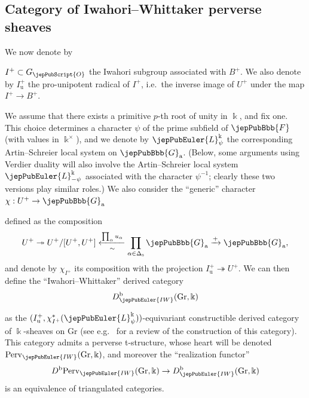 \subsection{Category of Iwahori--Whittaker perverse sheaves}
\label{jep104local034}

We now denote by 

$I^+ \subset G_{\jepPubScript{O}}$ the Iwahori subgroup associated with $B^+$. We also denote by $I^+_\mathrm{u}$ the pro-unipotent radical of $I^+$, i.e.~the inverse image of $U^+$ under the map $I^+ \to B^+$.

We assume that there exists a primitive $p$-th root of unity in $\Bbbk$, and fix one. This choice determines a
character $\psi$ of the prime subfield of $\jepPubBbb{F}$ (with values in $\Bbbk^\times$), and we denote by $\jepPubEuler{L}^\Bbbk_\psi$ the corresponding Artin--Schreier local system on $\jepPubBbb{G}_{\mathrm{a}}$. (Below, some arguments using Verdier duality will also involve the Artin--Schreier local system $\jepPubEuler{L}^\Bbbk_{-\psi}$ associated with the character $\psi^{-1}$; clearly these two versions play similar roles.) We also consider the ``generic'' character $\chi : U^+ \to \jepPubBbb{G}_{\mathrm{a}}$ 

defined as the composition
\[
 U^+ \twoheadrightarrow U^+ / [U^+,U^+] \xleftarrow[\sim]{\prod_{\alpha} u_\alpha} \prod_{\alpha \in \Delta_{\mathrm{s}}} \jepPubBbb{G}_{\mathrm{a}} \xrightarrow{+} \jepPubBbb{G}_{\mathrm{a}},
\]
and denote by $\chi_{I^+}$ its composition with the projection $I^+_\mathrm{u} \twoheadrightarrow U^+$. We can then define the ``Iwahori--Whittaker'' derived category
\[
D^{\mathrm{b}}_{\jepPubEuler{IW}}(\mathrm{Gr}, \Bbbk)
\]

as the $(I^+_\mathrm{u}, \chi_{I^+}^*(\jepPubEuler{L}^\Bbbk_\psi))$-equivariant constructible derived category of $\Bbbk$-sheaves on $\mathrm{Gr}$ (see e.g.~\cite[App.~A]{jep104ref03} for a review of the construction of this category). This category admits a perverse t-structure, whose heart will be denoted $\mathrm{Perv}_{\jepPubEuler{IW}}(\mathrm{Gr},\Bbbk)$, and moreover the ``realization functor''
\[
D^{\mathrm{b}} \mathrm{Perv}_{\jepPubEuler{IW}}(\mathrm{Gr},\Bbbk) \to D^{\mathrm{b}}_{\jepPubEuler{IW}}(\mathrm{Gr}, \Bbbk)
\]
is an equivalence of triangulated categories.

